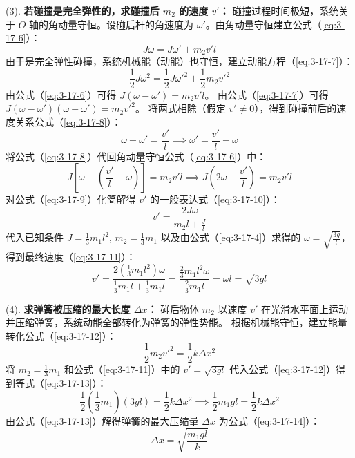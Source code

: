 (3). \textbf{若碰撞是完全弹性的，求碰撞后 $m_2$ 的速度 $v'$：}
碰撞过程时间极短，系统关于 $O$ 轴的角动量守恒。设碰后杆的角速度为 $\omega'$。由角动量守恒建立公式（\ref{eq:3-17-6}）：
\begin{equation}\label{eq:3-17-6}
	J\omega = J\omega' + m_2 v' l
\end{equation}
由于是完全弹性碰撞，系统机械能（动能）也守恒，建立动能方程（\ref{eq:3-17-7}）：
\begin{equation}\label{eq:3-17-7}
	\frac{1}{2}J\omega^2 = \frac{1}{2}J\omega'^2 + \frac{1}{2}m_2 v'^2
\end{equation}
由公式（\ref{eq:3-17-6}）可得 $J(\omega - \omega') = m_2 v' l$。
由公式（\ref{eq:3-17-7}）可得 $J(\omega - \omega')(\omega + \omega') = m_2 v'^2$。
将两式相除（假定 $v' \neq 0$），得到碰撞前后的速度关系公式（\ref{eq:3-17-8}）：
\begin{equation}\label{eq:3-17-8}
	\omega + \omega' = \frac{v'}{l} \implies \omega' = \frac{v'}{l} - \omega
\end{equation}
将公式（\ref{eq:3-17-8}）代回角动量守恒公式（\ref{eq:3-17-6}）中：
\begin{equation}\label{eq:3-17-9}
	J\left[\omega - \left(\frac{v'}{l} - \omega\right)\right] = m_2 v' l \implies J\left(2\omega - \frac{v'}{l}\right) = m_2 v' l
\end{equation}
对公式（\ref{eq:3-17-9}）化简解得 $v'$ 的一般表达式（\ref{eq:3-17-10}）：
\begin{equation}\label{eq:3-17-10}
	v' = \frac{2J\omega}{m_2 l + \frac{J}{l}}
\end{equation}
代入已知条件 $J = \frac{1}{3}m_1 l^2$, $m_2 = \frac{1}{3}m_1$ 以及由公式（\ref{eq:3-17-4}）求得的 $\omega = \sqrt{\frac{3g}{l}}$，得到最终速度（\ref{eq:3-17-11}）：
\begin{equation}\label{eq:3-17-11}
	v' = \frac{2\left(\frac{1}{3}m_1 l^2\right)\omega}{\frac{1}{3}m_1 l + \frac{1}{3}m_1 l} = \frac{\frac{2}{3}m_1 l^2 \omega}{\frac{2}{3}m_1 l} = \omega l = \sqrt{3gl}
\end{equation}

(4). \textbf{求弹簧被压缩的最大长度 $\Delta x$：}
碰后物体 $m_2$ 以速度 $v'$ 在光滑水平面上运动并压缩弹簧，系统动能全部转化为弹簧的弹性势能。
根据机械能守恒，建立能量转化公式（\ref{eq:3-17-12}）：
\begin{equation}\label{eq:3-17-12}
	\frac{1}{2}m_2 v'^2 = \frac{1}{2}k \Delta x^2
\end{equation}
将 $m_2 = \frac{1}{3}m_1$ 和公式（\ref{eq:3-17-11}）中的 $v' = \sqrt{3gl}$ 代入公式（\ref{eq:3-17-12}）得到等式（\ref{eq:3-17-13}）：
\begin{equation}\label{eq:3-17-13}
	\frac{1}{2}\left(\frac{1}{3}m_1\right)(3gl) = \frac{1}{2}k \Delta x^2 \implies \frac{1}{2}m_1 g l = \frac{1}{2}k \Delta x^2
\end{equation}
由公式（\ref{eq:3-17-13}）解得弹簧的最大压缩量 $\Delta x$ 为公式（\ref{eq:3-17-14}）：
\begin{equation}\label{eq:3-17-14}
	\Delta x = \sqrt{\frac{m_1 g l}{k}}
\end{equation}

